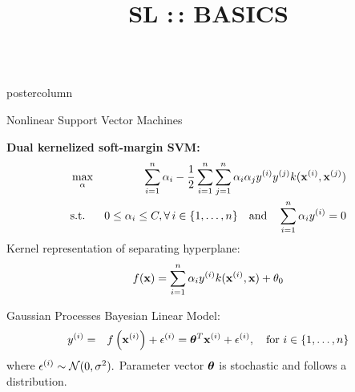 \documentclass{beamer}
\title{SL :\,: BASICS} %
\newlength{\columnheight} %
\begin{document}
	\begin{frame}[fragile]{}
		\vspace{-8ex}
		\begin{columns}
			\begin{column}{.31\textwidth}
				\begin{beamercolorbox}[center]{postercolumn}
					\begin{minipage}{.98\textwidth}
						\parbox[t][\columnheight]{\textwidth}{
							\begin{myblock}{Nonlinear Support Vector Machines}
								
								\textbf{Dual kernelized soft-margin SVM:}
									\begin{eqnarray*}
										& \max_{\alpha} & \sum_{i=1}^n \alpha_i - \frac{1}{2}\sum_{i=1}^n\sum_{j=1}^n\alpha_i\alpha_jy^{(i)} y^{(j)} k(\mathbf{x}^{(i)}, \mathbf{x}^{(j)})  \\
										& \text{s.t. } & 0 \le \alpha_i \le C, \forall\, i \in \{1, \ldots, n\} \quad \text{and} \quad  \sum_{i=1}^n \alpha_i y^{(i)} = 0
									\end{eqnarray*}	
								Kernel representation of separating hyperplane:
									$$ f(\mathbf{x}) = \sum\limits_{i=1}^n \alpha_i y^{(i)} k(\mathbf{x}^{(i)}, \mathbf{x})  + \theta_0$$
							\end{myblock}
							\begin{myblock}{Gaussian Processes}
								Bayesian Linear Model:
								\begin{eqnarray*}
									y^{(i)} &=& f\left(\mathbf{x}^{(i)}\right) + \epsilon^{(i)} = \bm{\theta}^T \mathbf{x}^{(i)} + \epsilon^{(i)}, \quad \text{for } i \in \{1, \ldots, n\}
								\end{eqnarray*}
								where $\epsilon^{(i)} \sim \mathcal{N}(0, \sigma^2).$
								Parameter vector $\bm{\theta}$ is stochastic and follows a distribution.\\
								

\end{myblock}}
\end{minipage}
\end{beamercolorbox}
\end{column}
\end{columns}
\end{frame}
\end{document}
